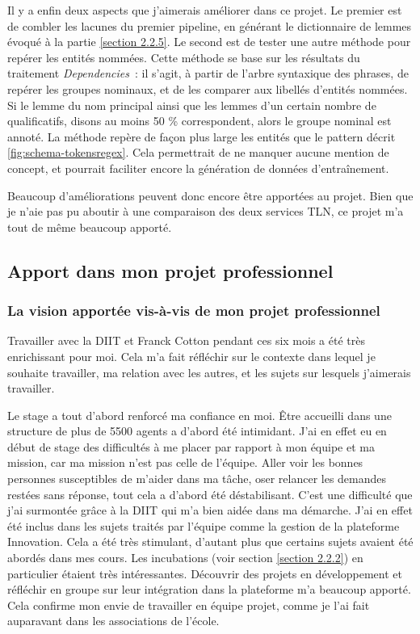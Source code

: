 Il y a enfin deux aspects que j'aimerais améliorer dans ce projet. Le premier est de combler les lacunes du premier pipeline, en générant le dictionnaire de lemmes évoqué à la partie \ref{section 2.2.5}. Le second est de tester une autre méthode pour repérer les entités nommées. Cette méthode se base sur les résultats du traitement \textit{Dependencies}~: il s'agit, à partir de l'arbre syntaxique des phrases, de repérer les groupes nominaux, et de les comparer aux libellés d'entités nommées. Si le lemme du nom principal ainsi que les lemmes d'un certain nombre de qualificatifs, disons au moins 50 \% correspondent, alors le groupe nominal est annoté. La méthode repère de façon plus large les entités que le pattern décrit \autoref{fig:schema-tokensregex}. Cela permettrait de ne manquer aucune mention de concept, et pourrait faciliter encore la génération de données d'entraînement.
\newline

Beaucoup d'améliorations peuvent donc encore être apportées au projet. Bien que je n'aie pas pu aboutir à une comparaison des deux services TLN, ce projet m'a tout de même beaucoup apporté.

\subsection{Apport dans mon projet professionnel}
\subsubsection{La vision apportée vis-à-vis de mon projet professionnel}

Travailler avec la DIIT et Franck Cotton pendant ces six mois a été très enrichissant pour moi. Cela m'a fait réfléchir sur le contexte dans lequel je souhaite travailler, ma relation avec les autres, et les sujets sur lesquels j'aimerais travailler.
\newline

Le stage a tout d'abord renforcé ma confiance en moi. Être accueilli dans une structure de plus de 5500 agents a d'abord été intimidant. J'ai en effet eu en début de stage des difficultés à me placer par rapport à mon équipe et ma mission, car ma mission n'est pas celle de l'équipe. Aller voir les bonnes personnes susceptibles de m'aider dans ma tâche, oser relancer les demandes restées sans réponse, tout cela a d'abord été déstabilisant. C'est une difficulté que j'ai surmontée grâce à la DIIT qui m'a bien aidée dans ma démarche. J'ai en effet été inclus dans les sujets traités par l'équipe comme la gestion de la plateforme Innovation. Cela a été très stimulant, d'autant plus que certains sujets avaient été abordés dans mes cours. Les incubations (voir section \ref{section 2.2.2}) en particulier étaient très intéressantes. Découvrir des projets en développement et réfléchir en groupe sur leur intégration dans la plateforme m'a beaucoup apporté. Cela confirme mon envie de travailler en équipe projet, comme je l'ai fait auparavant dans les associations de l'école.
\newline

